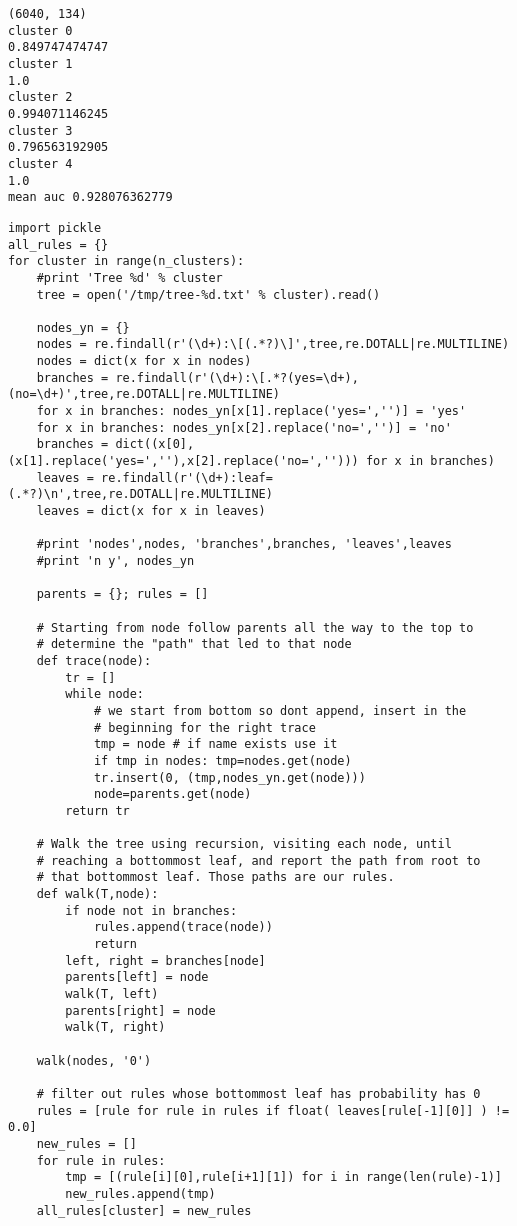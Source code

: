 \documentclass[12pt,fleqn]{article}\usepackage{../common}
\begin{document}
\begin{verbatim}
(6040, 134)
cluster 0
0.849747474747
cluster 1
1.0
cluster 2
0.994071146245
cluster 3
0.796563192905
cluster 4
1.0
mean auc 0.928076362779
\end{verbatim}


\begin{verbatim}
import pickle
all_rules = {}
for cluster in range(n_clusters):
    #print 'Tree %d' % cluster
    tree = open('/tmp/tree-%d.txt' % cluster).read()
    
    nodes_yn = {}
    nodes = re.findall(r'(\d+):\[(.*?)\]',tree,re.DOTALL|re.MULTILINE)
    nodes = dict(x for x in nodes)
    branches = re.findall(r'(\d+):\[.*?(yes=\d+),(no=\d+)',tree,re.DOTALL|re.MULTILINE)
    for x in branches: nodes_yn[x[1].replace('yes=','')] = 'yes'
    for x in branches: nodes_yn[x[2].replace('no=','')] = 'no'
    branches = dict((x[0],(x[1].replace('yes=',''),x[2].replace('no=',''))) for x in branches)
    leaves = re.findall(r'(\d+):leaf=(.*?)\n',tree,re.DOTALL|re.MULTILINE)        
    leaves = dict(x for x in leaves)

    #print 'nodes',nodes, 'branches',branches, 'leaves',leaves
    #print 'n y', nodes_yn

    parents = {}; rules = []

    # Starting from node follow parents all the way to the top to
    # determine the "path" that led to that node
    def trace(node):
        tr = []
        while node:
            # we start from bottom so dont append, insert in the
            # beginning for the right trace
            tmp = node # if name exists use it
            if tmp in nodes: tmp=nodes.get(node)
            tr.insert(0, (tmp,nodes_yn.get(node)))
            node=parents.get(node)
        return tr

    # Walk the tree using recursion, visiting each node, until
    # reaching a bottommost leaf, and report the path from root to
    # that bottommost leaf. Those paths are our rules.
    def walk(T,node):
        if node not in branches:
            rules.append(trace(node))
            return
        left, right = branches[node]
        parents[left] = node
        walk(T, left)
        parents[right] = node
        walk(T, right)

    walk(nodes, '0')
    
    # filter out rules whose bottommost leaf has probability has 0
    rules = [rule for rule in rules if float( leaves[rule[-1][0]] ) != 0.0]
    new_rules = []
    for rule in rules:
        tmp = [(rule[i][0],rule[i+1][1]) for i in range(len(rule)-1)]
        new_rules.append(tmp)
    all_rules[cluster] = new_rules
    

\end{verbatim}
\end{document}
